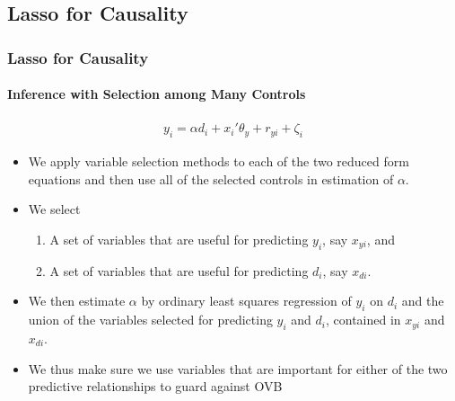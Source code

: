 \documentclass[
  shownotes,
  xcolor={svgnames},
  hyperref={colorlinks,citecolor=DarkBlue,linkcolor=DarkRed,urlcolor=DarkBlue}
  , aspectratio=169]{beamer}
\begin{document}
\subsection{Lasso for Causality}
\begin{frame}[fragile]
\frametitle{Lasso for Causality}
\framesubtitle{Inference with Selection among Many Controls}

\begin{align}
    y_i = \alpha d_i + x_i'\theta_y +r_{yi} + \zeta_i
  \end{align}

\begin{itemize}
\item We apply variable selection methods to each of the two reduced form equations and then use all of the selected controls in estimation of $\alpha$. 
\medskip
\item We select
\begin{enumerate}
\item A set of variables that are useful for predicting $y_i$, say $x_{yi}$, and 
\item A set of variables that are useful for predicting $d_i$, say $x_{di}$.

\end{enumerate}
\item We then estimate $\alpha$ by ordinary least squares regression of $y_i$ on $d_i$ and the union of the variables selected for predicting $y_i$ and $d_i$, contained in $x_{yi}$ and $x_{di}$. 

\item We thus make sure we use variables that are important for either of the two predictive relationships to guard against OVB

\end{itemize}
\end{frame}
\end{document}
